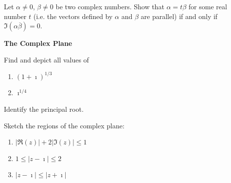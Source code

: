 {\begin{Exercise}
\end{Exercise}






\begin{Exercise}
  \label{exercise alpha = t beta}
  Let $\alpha \neq 0$, $\beta \neq 0$ be two complex numbers.
  Show that $\alpha = t \beta$ for some real number $t$ (i.e. the vectors
  defined by $\alpha$ and $\beta$ are parallel) if and only if
  $\Im\left( \alpha \overline{\beta} \right) = 0$.

\end{Exercise}







\begin{large}
  \noindent
  \textbf{The Complex Plane}
\end{large}




\begin{Exercise}
  \label{exercise 1i13}
  Find and depict all values of
  \begin{enumerate}
  \item
    $\displaystyle
    (1 + \imath)^{1/3}
    $
  \item
    $\displaystyle
    \imath^{1/4}
    $
  \end{enumerate}
  Identify the principal root.

\end{Exercise}






\begin{Exercise}
  \label{exercise Rez+2Imz1}
  Sketch the regions of the complex plane:
  \begin{enumerate}
  \item
    $\displaystyle
    | \Re(z) | + 2 | \Im(z) | \leq 1
    $
  \item
    $\displaystyle
    1 \leq |z - \imath| \leq 2
    $
  \item
    $\displaystyle
    |z - \imath| \leq |z + \imath|
    $
  \end{enumerate}

\end{Exercise}








}

